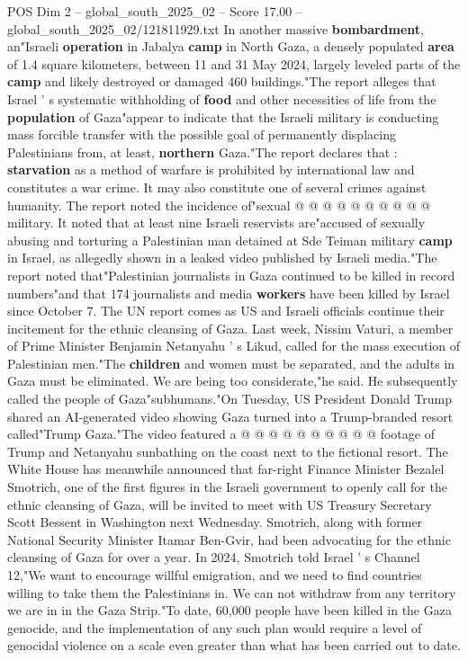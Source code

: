 \begin{textsample}{POS Dim 2 – global\_south\_2025\_02 – Score 17.00 – global\_south\_2025\_02/121811929.txt}
In another massive \textbf{bombardment}, an"Israeli \textbf{operation} in Jabalya \textbf{camp} in North Gaza, a densely populated \textbf{area} of 1.4 square kilometers, between 11 and 31 May 2024, largely leveled parts of the \textbf{camp} and likely destroyed or damaged 460 buildings."The report alleges that Israel ' s systematic withholding of \textbf{food} and other necessities of life from the \textbf{population} of Gaza"appear to indicate that the Israeli military is conducting mass forcible transfer with the possible goal of permanently displacing Palestinians from, at least, \textbf{northern} Gaza."The report declares that : \textbf{starvation} as a method of warfare is prohibited by international law and constitutes a war crime.
It may also constitute one of several crimes against humanity.
The report noted the incidence of"sexual @ @ @ @ @ @ @ @ @ @ military.
It noted that at least nine Israeli reservists are"accused of sexually abusing and torturing a Palestinian man detained at Sde Teiman military \textbf{camp} in Israel, as allegedly shown in a leaked video published by Israeli media."The report noted that"Palestinian journalists in Gaza continued to be killed in record numbers"and that 174 journalists and media \textbf{workers} have been killed by Israel since October 7.
The UN report comes as US and Israeli officials continue their incitement for the ethnic cleansing of Gaza.
Last week, Nissim Vaturi, a member of Prime Minister Benjamin Netanyahu ' s Likud, called for the mass execution of Palestinian men."The \textbf{children} and women must be separated, and the adults in Gaza must be eliminated.
We are being too considerate,"he said.
He subsequently called the people of Gaza"subhumans."On Tuesday, US President Donald Trump shared an AI-generated video showing Gaza turned into a Trump-branded resort called"Trump Gaza."The video featured a @ @ @ @ @ @ @ @ @ @ footage of Trump and Netanyahu sunbathing on the coast next to the fictional resort.
The White House has meanwhile announced that far-right Finance Minister Bezalel Smotrich, one of the first figures in the Israeli government to openly call for the ethnic cleansing of Gaza, will be invited to meet with US Treasury Secretary Scott Bessent in Washington next Wednesday.
Smotrich, along with former National Security Minister Itamar Ben-Gvir, had been advocating for the ethnic cleansing of Gaza for over a year.
In 2024, Smotrich told Israel ' s Channel 12,"We want to encourage willful emigration, and we need to find countries willing to take them the Palestinians in.
We can not withdraw from any territory we are in in the Gaza Strip."To date, 60,000 people have been killed in the Gaza genocide, and the implementation of any such plan would require a level of genocidal violence on a scale even greater than what has been carried out to date.

\end{textsample}
